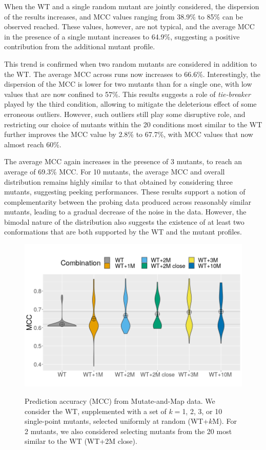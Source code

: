 \documentclass[a4,center,fleqn]{NAR}
\begin{document}
When the WT and a single random mutant are jointly considered, the dispersion of the results increases, and MCC values ranging from 38.9\% to 85\% can be observed reached.%
These values, however, are not typical, and the average MCC in the presence of a single mutant increases to 64.9\%,%
suggesting a positive contribution from the additional mutant profile. 

This trend is confirmed when two random mutants are considered in addition to the WT. The average MCC across runs now increases to 66.6\%. %
Interestingly, the dispersion of the MCC is lower for two mutants than for a single one, with low values that are now confined to 57\%.  This results suggests  a role of \emph{tie-breaker} played by the third condition, allowing to mitigate the deleterious effect of some erroneous outliers.
However, such outliers still play some disruptive role, and restricting our choice of mutants within the 20 conditions most similar to the WT further improves the MCC value by 2.8\% to 67.7\%, with MCC values that now almost reach 60\%.  

The average MCC again increases in the presence of 3 mutants, to reach an average of 69.3\% MCC. For 10 mutants, the average MCC and overall distribution remains highly similar to that obtained by considering three mutants, suggesting peeking performances. These results support a notion of complementarity between the probing data produced across reasonably similar mutants, leading to a gradual decrease of the noise in the data. However, the bimodal nature of the distribution also suggests the existence of at least two conformations that are both supported by the WT and the mutant profiles.


\begin{figure}
	{\centering
		\includegraphics[width=\linewidth]{graphs/combinationscale.png}\\}
		
	\caption{Prediction accuracy (MCC) from Mutate-and-Map data. We consider the WT, supplemented with a set of $k=$1, 2, 3, or 10 single-point mutants, selected uniformly at random ({\sf WT+$k$M}). For 2 mutants, we also considered selecting mutants from the 20 most similar to the WT ({\sf WT+2M close}).}\label{fig:variantanalysis}
\end{figure}
\end{document}

